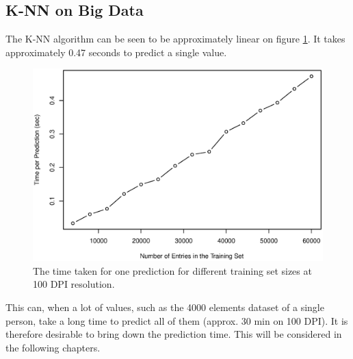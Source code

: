 \subsection{K-NN on Big Data}
The K-NN algorithm can be seen to be approximately linear on figure \ref{fig:predictionTimeVStrainSize}.
It takes approximately 0.47 seconds to predict a single value.

\begin{figure}[H]
\centering
\includegraphics[width = 0.95 \textwidth]{graphics/graph_timeVSppl}
\caption{The time taken for one prediction for different training set sizes at 100 DPI resolution.}
\label{fig:predictionTimeVStrainSize}
\end{figure}

This can, when a lot of values, such as the 4000 elements dataset of a single person, take a long time to predict all of them (approx. 30 min on 100 DPI).
It is therefore desirable to bring down the prediction time.
This will be considered in the following chapters.
